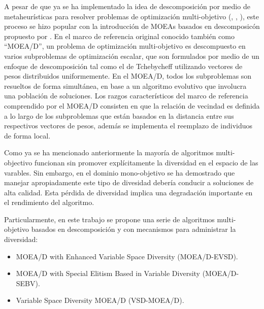 A pesar de que ya se ha implementado la idea de descomposición por medio de metaheurísticas para resolver problemas de optimización multi-objetivo (\cite{ishibuchi1996multi}, \cite{murata2002cellular}, \cite{jin2001adapting}), este proceso se hizo popular con la introducción de MOEAs basados en descomposicón propuesto por \citeauthor{zhang2007moea}.
%
En el marco de referencia original conocido también como ``MOEA/D'', un problema de optimización multi-objetivo es descompuesto en varios subproblemas de optimización escalar, que son formulados por medio de un enfoque de descomposición tal como el de Tchebycheff utilizando vectores de pesos distribuidos uniformemente.
%
En el MOEA/D, todos los subproblemas son resueltos de forma simultánea, en base a un algoritmo evolutivo que involucra una población de soluciones.
%
Los razgos característicos del marco de referencia comprendido por el MOEA/D consisten en que la relación de vecindad es definida a lo largo de los subproblemas que están basados en la distancia entre sus respectivos vectores de pesos, además se implementa el reemplazo de individuos de forma local.
%


Como ya se ha mencionado anteriormente la mayoría de algoritmos multi-objectivo funcionan sin promover explícitamente la diversidad en el espacio de las varables.
%
%
Sin embargo, en el dominio mono-objetivo se ha demostrado que manejar apropiadamente este tipo de divesidad debería conducir a soluciones de alta calidad.
%
Esta pérdida de diversidad implica una degradación importante en el rendimiento del algoritmo.

%

Particularmente, en este trabajo se propone una serie de algoritmos multi-objetivo basados en descomposición y con mecanismos para administrar la diversidad:
\begin{itemize}
\item MOEA/D with Enhanced Variable Space Diversity (MOEA/D-EVSD).
\item MOEA/D with Special Elitism Based in Variable Diversity (MOEA/D-SEBV).
\item Variable Space Diversity MOEA/D (VSD-MOEA/D).
\end{itemize} %
%

